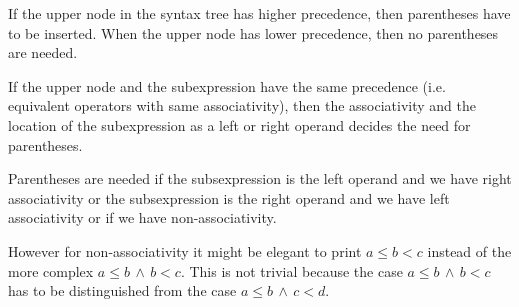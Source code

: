 If the upper node in the syntax tree has higher precedence, then parentheses
have to be inserted. When the upper node has lower precedence, then no
parentheses are needed.

If the upper node and the subexpression have the same precedence (i.e.
equivalent operators with same associativity), then the associativity and the
location of the subexpression as a left or right operand decides the need for
parentheses.

Parentheses are needed if the subsexpression is the left operand and we have
right associativity or the subsexpression is the right operand and we have
left associativity or if we have non-associativity.

However for non-associativity it might be elegant to print $a \le b < c$
instead of the more complex $a \le b \,\land\, b < c$. This is not trivial
because the case $a \le b \,\land\, b < c$ has to be distinguished from the
case $a \le b \,\land\, c < d$.








